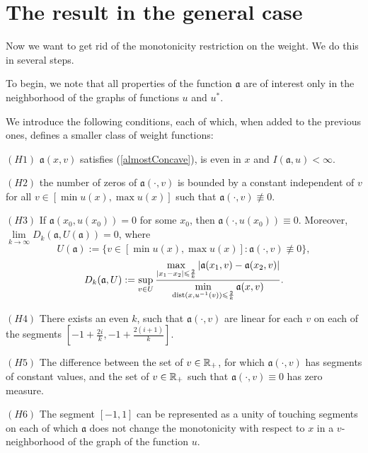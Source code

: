 \section{The result in the general case}
\label{moveForth}

Now we want to get rid of the monotonicity restriction on the weight.
We do this in several steps.

To begin, we note that all properties of the function $\mathfrak a$ are of interest
only in the neighborhood of the graphs of functions $u$ and $u^*$.

We introduce the following conditions, each of which, when added to the previous ones, defines a smaller class of weight functions:

\bigskip

\smallskip
\noindent
$(H1)$ $\mathfrak a(x, v)$ satisfies (\ref{almostConcave}), is even in $x$ and $I(\mathfrak a, u) < \infty$.
\smallskip

\bigskip
\noindent
$(H2)$ the number of zeros of $\mathfrak a(\cdot, v)$ is bounded by a constant independent of $v$
for all $v \in [\min u(x), \max u(x)]$ such that $\mathfrak a(\cdot, v) \not \equiv 0$.

\bigskip
\noindent
$(H3)$ If $\mathfrak a(x_0, u(x_0)) = 0$ for some $x_0$, then $\mathfrak a(\cdot, u(x_0)) \equiv 0$.
Moreover, $\lim\limits_{k \to \infty} D_k(\mathfrak a, U(\mathfrak a)) = 0$, where
$$U(\mathfrak a) := \{ v \in [\min u(x), \max u(x)]: \mathfrak a(\cdot, v) \not \equiv 0 \},$$
\begin{equation}
\label{bigD}
D_k(\mathfrak a, U): = \sup \limits_{v \in U}
\frac{\max \limits_{\abs{x_1 - x_2} \le \frac{2}{k}} \abs{\mathfrak a(x_1, v) - \mathfrak a(x_2, v)}}
{\min \limits_{\dist (x, u^{-1} (v)) \le \frac{2}{k}} \mathfrak a(x, v)}.
\end{equation}

\bigskip
\noindent
$(H4)$ There exists an even $k$, such that $\mathfrak a(\cdot, v)$ are linear for each $v$ on each of the segments
$[-1 + \frac{2i}{k}, -1 + \frac{2(i + 1)}{k}]$.

\bigskip
\noindent
$(H5)$ The difference between the
set of $v \in \mathbb R_+$, for which $\mathfrak a(\cdot, v)$ has segments of constant values,
and the set of $v \in \mathbb R_+$ such that $\mathfrak a(\cdot, v) \equiv 0$
has zero measure.

\bigskip
\noindent
$(H6)$ The segment $[-1, 1]$ can be represented as a unity of touching segments
on each of which $\mathfrak a$ does not change the monotonicity with respect to $x$ in a $v$-neighborhood of the graph of the function $u$.

